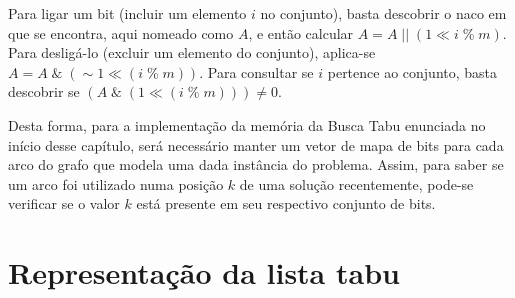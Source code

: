 \par Para ligar um bit (incluir um elemento $i$ no conjunto), basta descobrir o naco em que se encontra, aqui nomeado como $A$, e então calcular $A = A \;||\; (1 \ll i \;\%\; m)$. Para desligá-lo (excluir um elemento do conjunto), aplica-se $A = A \;\&\; (\sim 1 \ll (i \;\%\; m))$. Para consultar se $i$ pertence ao conjunto, basta descobrir se $(A \;\&\; ( 1 \ll (i \;\%\; m))) \neq 0$.

\par Desta forma, para a implementação da memória da Busca Tabu enunciada no início desse capítulo, será necessário manter um vetor de mapa de bits para cada arco do grafo que modela uma dada instância do problema. Assim, para saber se um arco foi utilizado numa posição $k$ de uma solução recentemente, pode-se verificar se o valor $k$ está presente em seu respectivo conjunto de bits.

\section{Representação da lista tabu}\label{sec:LABEL_CHP_6_SEC_C}